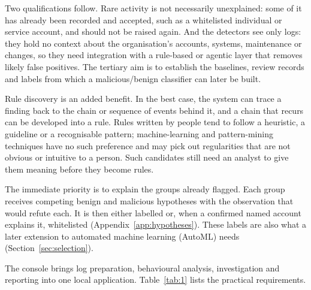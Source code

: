 \documentclass[11pt,a4paper]{article}
\begin{document}
Two qualifications follow. Rare activity is not necessarily unexplained: some of it has already been recorded and accepted, such as a whitelisted individual or service account, and should not be raised again. And the detectors see only logs: they hold no context about the organisation's accounts, systems, maintenance or changes, so they need integration with a rule-based or agentic layer that removes likely false positives. The tertiary aim is to establish the baselines, review records and labels from which a malicious/benign classifier can later be built.

Rule discovery is an added benefit. In the best case, the system can trace a finding back to the chain or sequence of events behind it, and a chain that recurs can be developed into a rule. Rules written by people tend to follow a heuristic, a guideline or a recognisable pattern; machine-learning and pattern-mining techniques have no such preference and may pick out regularities that are not obvious or intuitive to a person. Such candidates still need an analyst to give them meaning before they become rules.

The immediate priority is to explain the groups already flagged. Each group receives competing benign and malicious hypotheses with the observation that would refute each. It is then either labelled or, when a confirmed named account explains it, whitelisted (Appendix~\ref{app:hypotheses}). These labels are also what a later extension to automated machine learning (AutoML) needs (Section~\ref{sec:selection}).

The console brings log preparation, behavioural analysis, investigation and reporting into one local application. Table~\ref{tab:1} lists the practical requirements.
\end{document}
